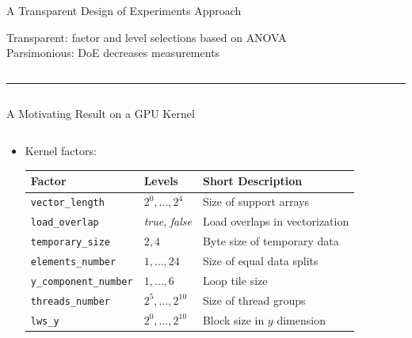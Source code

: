 \documentclass[11pt, compress, aspectratio=169, xcolor={table,usenames,dvipsnames}]{beamer}
\begin{document}
\begin{frame}
\begin{columns}
\begin{column}{0.89\columnwidth}
\begin{columns}
\begin{column}[t]{0.48\columnwidth}
\begin{block}{A Transparent Design of Experiments Approach}
\begin{itemize}
\begin{center}
  {\normalsize
    \colorbox{WinterSkin}{\alert{\vphantom{g}Transparent}: {\small \alert{factor} and \alert{level} selections based on \alert{ANOVA}}} \\[0.2em]
    \colorbox{WinterSkin}{\alert{Parsimonious}: {\small DoE \alert{decreases measurements}}}
  }
\end{center}
\end{itemize}
\end{block}
\end{column}
\end{columns}
\vspace{0.2em}
\rule{\columnwidth}{0.4ex}
\vspace{-2.5em}
\begin{columns}
\begin{column}[t]{0.48\columnwidth}
\begin{block}{A Motivating Result on a GPU Kernel}
\begin{columns}
\begin{column}{0.49\columnwidth}
\begin{itemize}
\item Kernel \alert{factors}:
\vspace{0.6em}
\begin{table}[htbp]
\centering
\tiny
\begin{tabular}{llp{}}
\toprule
Factor & Levels & Short Description\\
\midrule
\texttt{vector\_length} & \(2^0,\dots,2^4\) & Size of support arrays\\
\texttt{load\_overlap} & \textit{true}, \textit{false} & Load overlaps in vectorization\\
\texttt{temporary\_size} & \(2,4\) & Byte size of temporary data\\
\texttt{elements\_number} & \(1,\dots,24\) & Size of equal data splits\\
\texttt{y\_component\_number} & \(1,\dots,6\) & Loop tile size\\
\texttt{threads\_number} & \(2^5,\dots,2^{10}\) & Size of thread groups\\
\texttt{lws\_y} & \(2^0,\dots,2^{10}\) & Block size in \(y\) dimension\\
\bottomrule
\end{tabular}
\end{table}
\end{itemize}
\end{column}


\end{columns}
\end{block}
\end{column}
\end{columns}
\end{column}
\end{columns}
\end{frame}
\end{document}
